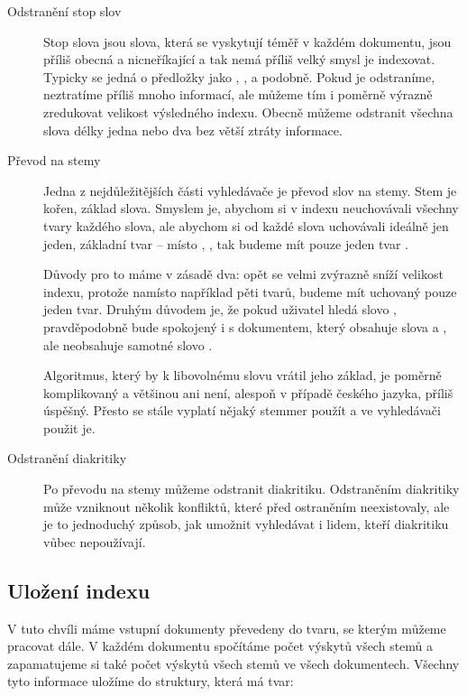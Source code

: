 \documentclass[12pt]{article}
\begin{document}
\begin{description}

\item[Odstranění stop slov] Stop slova jsou slova, která se vyskytují téměř v každém dokumentu, jsou příliš obecná a nicneříkající a tak nemá příliš velký smysl je indexovat. Typicky se jedná o předložky jako , ,  a podobně. Pokud je odstraníme, neztratíme příliš mnoho informací, ale můžeme tím i poměrně výrazně zredukovat velikost výsledného indexu. Obecně můžeme odstranit všechna slova délky jedna nebo dva bez větší ztráty informace. 

\item[Převod na stemy] Jedna z nejdůležitějších části vyhledávače je převod slov na stemy. Stem je kořen, základ slova. Smyslem je, abychom si v indexu neuchovávali všechny tvary každého slova, ale abychom si od každé slova uchovávali ideálně jen jeden, základní tvar -- místo , ,  tak budeme mít pouze jeden tvar .

Důvody pro to máme v zásadě dva: opět se velmi zvýrazně sníží velikost indexu, protože namísto například pěti tvarů, budeme mít uchovaný pouze jeden tvar. Druhým důvodem je, že pokud uživatel hledá slovo , pravděpodobně bude spokojený i s dokumentem, který obsahuje slova  a , ale neobsahuje samotné slovo . 

Algoritmus, který by k libovolnému slovu vrátil jeho základ, je poměrně komplikovaný a většinou ani není, alespoň v případě českého jazyka, příliš úspěšný. Přesto se stále vyplatí nějaký stemmer použít a ve vyhledávači použit je. 

\item[Odstranění diakritiky] Po převodu na stemy můžeme odstranit diakritiku. Odstraněním diakritiky může vzniknout několik konfliktů, které před ostraněním neexistovaly, ale je to jednoduchý způsob, jak umožnit vyhledávat i lidem, kteří diakritiku vůbec nepoužívají. 
\end{description} 


\subsection{Uložení indexu}
V tuto chvíli máme vstupní dokumenty převedeny do tvaru, se kterým můžeme pracovat dále. V každém dokumentu spočítáme počet výskytů všech stemů a zapamatujeme si také počet výskytů všech stemů ve všech dokumentech. Všechny tyto informace uložíme do struktury, která má tvar:
\end{document}
